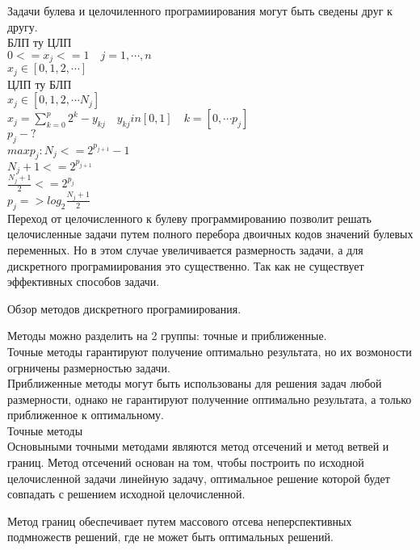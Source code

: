 Задачи булева и целочиленного програмиирования могут быть сведены друг к другу.\\
БЛП ту ЦЛП\\
$0 <=x_j <= 1 \quad j = 1, \cdots , n$\\
$x_j  \in [0,1,2, \cdots]$\\

ЦЛП ту БЛП\\
$x_j  \in [0,1,2, \cdots N_j]$\\
$x_j  =  \sum \limits_{k=0}^p  2^k - y_{kj} \quad y_{kj} in [0,1] \quad k = [0, \cdots p_j]$\\
$p_j - ? $\\
$ max p_j : N_j <= 2^{p_{j+1}} - 1$\\
$N_j + 1 <= 2^{p_{j+1}} $\\
$\frac{N_j + 1}{2} <= 2^{p_{j}} $\\
$p_j => log_2 \frac{N_j + 1}{2}$\\

Переход от целочисленного к булеву программированию позволит решать целочисленные задачи путем полного перебора
двоичных кодов значений булевых переменных.
Но в этом случае увеличивается размерность задачи, а для дискретного програмиирования это существенно.
Так как не существует эффективных способов задачи.

Обзор методов дискретного програмиирования.

Методы можно разделить на 2 группы: точные и приближенные.\\
Точные методы гарантируют получение оптимально результата, но их возмоности огрничены размерностью задачи.\\
Приближенные методы могут быть использованы для решения задач любой размерности,
однако не гарантируют полученние оптимально результата, а только приближенное к оптимальному.\\

Точные методы\\
Основыными точными методами являются метод отсечений и метод ветвей и границ.
Метод отсечений основан на том, чтобы построить по исходной целочисленной задачи линейную задачу,
оптимальное решение которой будет совпадать с решением исходной целочисленной.

Метод границ обеспечивает     путем массового отсева неперспективных подмножеств решений, где не может быть оптимальных решений.
